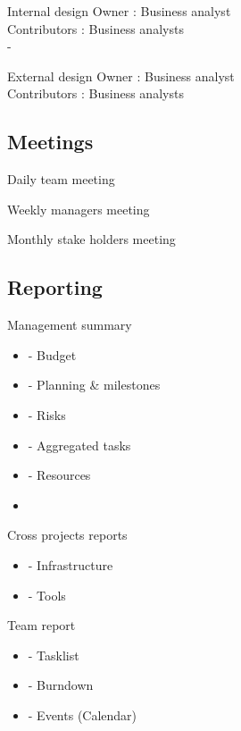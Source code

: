 \documentclass{beamer}
\begin{document}
\begin{frame}{Internal design}
Owner : Business analyst\\
Contributors : Business analysts\\
- 
\end{frame}

\begin{frame}{External design}
Owner : Business analyst\\
Contributors : Business analysts\\
\end{frame}

\subsection{Meetings}

\begin{frame}{Daily team meeting}
\end{frame}
\begin{frame}{Weekly managers meeting}
\end{frame}
\begin{frame}{Monthly stake holders meeting}
\end{frame}

\subsection{Reporting}

\begin{frame}{Management summary}
\begin{itemize}
  \item
- Budget
  \item
- Planning \& milestones
  \item
- Risks
  \item
- Aggregated tasks
  \item
- Resources
  \item
\end{itemize}
\end{frame}

\begin{frame}{Cross projects reports}
  \begin{itemize}
  \item
- Infrastructure
  \item
- Tools
  \end{itemize}
\end{frame}

\begin{frame}{Team report}
  \begin{itemize}
  \item
- Tasklist
  \item
- Burndown
  \item
- Events (Calendar)
  \end{itemize}
\end{frame}
\end{document}

